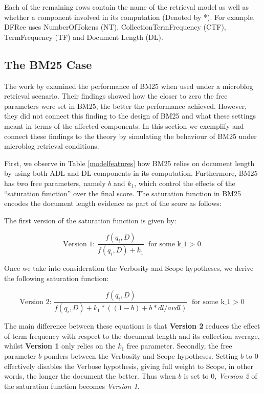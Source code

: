Each of the remaining rows contain the name of the retrieval model as well as whether a component involved in its computation (Denoted by *). For example, DFRee uses NumberOfTokens (NT), CollectionTermFrequency (CTF), TermFrequency (TF) and Document Length (DL).

\subsection{The BM25 Case}
\label{bm25case}
The work by \cite{ferguson2012investigation} examined the performance of BM25 when used under a microblog retrieval scenario. Their findings showed how the closer to zero the free parameters were set in BM25, the better the performance achieved. However, they did not connect this finding to the design of BM25 and what these settings meant in terms of the affected components. In this section we exemplify and connect these findings to the theory by simulating the behaviour of BM25 under microblog retrieval conditions.

First, we observe in Table \ref{modelfeatures} how BM25 relies on document length by using both ADL and DL components in its computation. Furthermore, BM25 has two free parameters, namely \(b\) and \(k_1\), which control the effects of the ``saturation function'' over the final score. The saturation function in BM25 encodes the document length evidence as part of the score as follows: 

The first version of the saturation function is given by:

\begin{equation}
 \text{Version 1: }\frac{f(q_i, D)}{f(q_i, D) + k_1} \text{   for some k_1 $>$ 0}
\end{equation}

Once we take into consideration the Verbosity and Scope hypotheses, we derive the following saturation function:

\begin{equation}
 \text{Version 2: }\frac{f(q_i, D)}{f(q_i, D) + k_1*((1-b)+b*dl/avdl)} \text{   for some k_1 $>$ 0}
\end{equation}

The main difference between these equations is that \textbf{Version 2} reduces the effect of term frequency with respect to the document length and its collection average, whilst \textbf{Version 1} only relies on the \(k_1\) free parameter. Secondly, the free parameter \(b\) ponders between the Verbosity and Scope hypotheses. Setting \(b\) to 0 effectively disables the Verbose hypothesis, giving full weight to Scope, in other words, the longer the document the better. Thus when \(b\) is set to 0, \textit{Version 2} of the saturation function becomes \textit{Version 1}.

